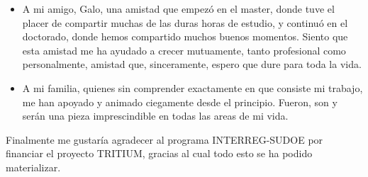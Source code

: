 \begin{itemize}
\item{} A mi amigo, Galo, una amistad que empezó en el master, donde tuve el placer de compartir muchas de las duras horas de estudio, y continuó en el doctorado, donde hemos compartido muchos buenos momentos. Siento que esta amistad me ha ayudado a crecer mutuamente, tanto profesional como personalmente, amistad que, sinceramente, espero que dure para toda la vida.

\item{} A mi familia, quienes sin comprender exactamente en que consiste mi trabajo, me han apoyado y animado ciegamente desde el principio. Fueron, son y serán una pieza imprescindible en todas las areas de mi vida.

\end{itemize} 

Finalmente me gustaría agradecer al programa INTERREG-SUDOE por financiar el proyecto TRITIUM, gracias al cual todo esto se ha podido materializar.